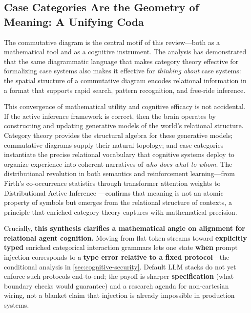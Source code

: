 \documentclass[
]{article}
\begin{document}
\subsection{Case Categories Are the Geometry of Meaning: A Unifying
Coda}\label{case-categories-are-the-geometry-of-meaning-a-unifying-coda}

The commutative diagram is the central motif of this review---both as a
mathematical tool and as a cognitive instrument. The analysis has
demonstrated that the same diagrammatic language that makes category
theory effective for formalizing case systems also makes it effective
for \emph{thinking about} case systems: the spatial structure of a
commutative diagram encodes relational information in a format that
supports rapid search, pattern recognition, and free-ride inference.

This convergence of mathematical utility and cognitive efficacy is not
accidental. If the active inference framework is correct, then the brain
operates by constructing and updating generative models of the world's
relational structure. Category theory provides the structural algebra
for these generative models; commutative diagrams supply their natural
topology; and case categories instantiate the precise relational
vocabulary that cognitive systems deploy to organize experience into
coherent narratives of \emph{who does what to whom}. The distributional
revolution in both semantics and reinforcement learning---from Firth's
\citeyearpar{firth1957papers} co-occurrence statistics through
transformer attention weights to Distributional Active Inference
\citep{akgul2026distributional}---confirms that meaning is not an atomic
property of symbols but emerges from the relational structure of
contexts, a principle that enriched category theory captures with
mathematical precision.

Crucially, \textbf{this synthesis clarifies a mathematical angle on
alignment for relational agent cognition.} Moving from flat token
streams toward \textbf{explicitly typed} enriched categorical
interaction grammars lets one state \textbf{when} prompt injection
corresponds to a \textbf{type error relative to a fixed protocol}---the
conditional analysis in \autoref{sec:cognitive-security}. Default LLM
stacks do not yet enforce such protocols end-to-end; the payoff is
sharper \textbf{specification} (what boundary checks would guarantee)
and a research agenda for non-cartesian wiring, not a blanket claim that
injection is already impossible in production systems.
\end{document}
